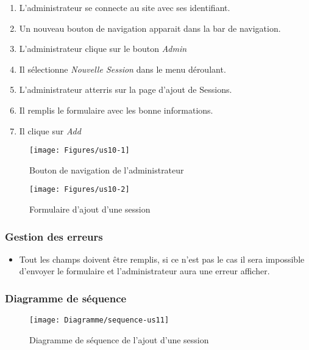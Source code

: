 \begin{enumerate}
	\item L'administrateur se connecte au site avec ses identifiant. 
	\item Un nouveau bouton de navigation apparait dans la bar de navigation. 
	\item L'administrateur clique sur le bouton \textit{Admin}
	\item Il sélectionne \textit{Nouvelle Session} dans le menu déroulant. 
	\item L'administrateur atterris sur la page d'ajout de Sessions. 
	\item Il remplis le formulaire avec les bonne informations.
	\item Il clique sur \textit{Add}
\end{enumerate}

\vspace{\baselineskip}
\begin{figure}[h]
	\texttt{[image: Figures/us10-1]}
	\caption{Bouton de navigation de l'administrateur}
\end{figure}

\vspace{\baselineskip}
\begin{figure}[h]
	\texttt{[image: Figures/us10-2]}
	\caption{Formulaire d'ajout d'une session}
\end{figure}

\newpage
\subsubsection{Gestion des erreurs}
	\begin{itemize}
		\item Tout les champs doivent être remplis, si ce n'est pas le cas il sera impossible d'envoyer le formulaire et l'administrateur aura une erreur afficher.
	\end{itemize}

\newpage
\subsubsection{Diagramme de séquence}
	\begin{figure}[h]
		\texttt{[image: Diagramme/sequence-us11]}
		\caption{Diagramme de séquence de l'ajout d'une session}
	\end{figure}

\vspace{\baselineskip}
